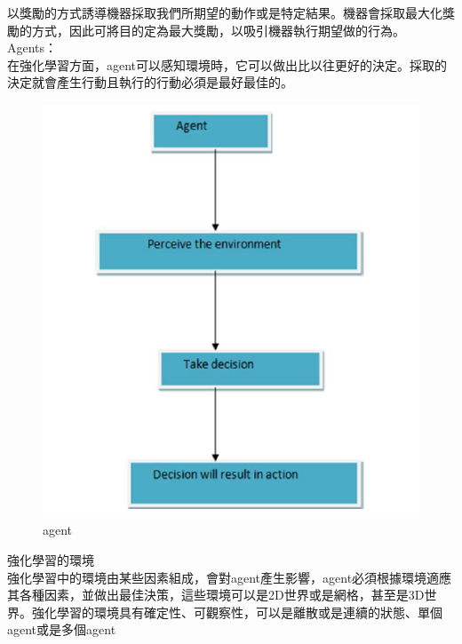 \documentclass[14pt,a4paper]{report}  %
\begin{document}
\qquad 以獎勵的方式誘導機器採取我們所期望的動作或是特定結果。機器會採取最大化獎勵的方式，因此可將目的定為最大獎勵，以吸引機器執行期望做的行為。\\[6pt]
Agents：\\[6pt]
\qquad 在強化學習方面，agent可以感知環境時，它可以做出比以往更好的決定。採取的決定就會產生行動且執行的行動必須是最好最佳的。\\[12pt]
\begin{figure}[hbt!]
\begin{center}
\includegraphics[scale=0.74]{agent}
\caption{agent}%
\end{center}
\end{figure}
強化學習的環境\\
\qquad 強化學習中的環境由某些因素組成，會對agent產生影響，agent必須根據環境適應其各種因素，並做出最佳決策，這些環境可以是2D世界或是網格，甚至是3D世界。強化學習的環境具有確定性、可觀察性，可以是離散或是連續的狀態、單個agent或是多個agent\\
\end{document}

